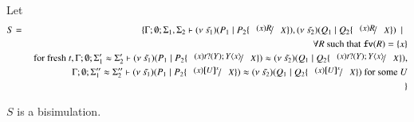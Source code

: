 
\begin{lemma}\rm
	\label{lem:subst_equiv}
	Let 
	\begin{eqnarray*}
		S &=& \set{ \Gamma; \es; \Sigma_1, \Sigma_2 \proves \newsp{\tilde{s_1}}{P_1 \Par P_2 \subst{(x) R}{X}}, \newsp{\tilde{s_2}}{Q_1 \Par Q_2 \subst{(x) R}{X}} \setbar \\
		&& \forall R \textrm{ such that } \fv{R} = \set{x}\\
		&& \textrm{ for fresh } t, \Gamma; \es; \Sigma_1' \wb \Sigma_2' \proves \newsp{\tilde{s_1}}{P_1 \Par P_2 \subst{(x) \binp{t}{Y} \appl{Y}{x}}{X}} \wb \newsp{\tilde{s_2}}{Q_1 \Par Q_2 \subst{(x) \binp{t}{Y} \appl{Y}{x}}{X}}, \\
		&& \Gamma; \es; \Sigma_1'' \wb \Sigma_2'' \proves \newsp{\tilde{s_1}}{P_1 \Par P_2 \subst{(x) \map{U}^x}{X}} \wb \newsp{\tilde{s_2}}{Q_1 \Par Q_2 \subst{(x) \map{U}^x}{X}} \textrm{ for some } U \\
		&&}
	\end{eqnarray*}

	$S$ is a bisimulation.
\end{lemma}

